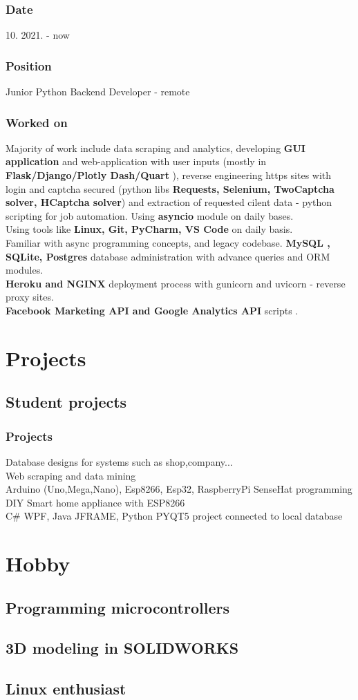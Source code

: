 \documentclass[10pt]{article}
\begin{document}
\subsubsection{Date}
10. 2021. -  now
\subsubsection{Position}
Junior Python Backend Developer - remote
\subsubsection{Worked on}
Majority of work include data scraping and analytics, developing \textbf{GUI application} and web-application with user inputs (mostly in \textbf{ Flask/Django/Plotly Dash/Quart} ), reverse engineering
https sites with login and captcha secured (python libs \textbf{Requests, Selenium, TwoCaptcha solver, HCaptcha solver}) and extraction of requested cilent data - python scripting for job automation. Using \textbf{asyncio} module on daily bases.
\\ Using tools like \textbf{Linux, Git,  PyCharm, VS Code} on daily basis.  \\
Familiar with async programming concepts, and legacy codebase.
\textbf{MySQL , SQLite,  Postgres} database administration with advance queries and ORM modules.\\
\textbf{Heroku and NGINX} deployment process with gunicorn and uvicorn - reverse proxy sites.\\
\textbf{Facebook Marketing API and Google Analytics API} scripts .\\



\section{Projects}
\subsection{\textbf{Student projects}}
\subsubsection{Projects}
Database designs for systems such as shop,company...\\
Web scraping and data mining\\
Arduino (Uno,Mega,Nano), Esp8266, Esp32, RaspberryPi SenseHat programming\\
DIY Smart home appliance with ESP8266 \\
C{\#} WPF, Java JFRAME, Python PYQT5 project connected to local database\\
 


\section{Hobby}
\subsection{Programming microcontrollers}
\subsection{3D modeling in SOLIDWORKS}
\subsection{Linux enthusiast}
\end{document}
